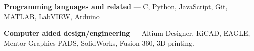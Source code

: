 \begin{zitemize}

    \item \textbf{Programming languages and related} --- C, Python, JavaScript, Git, MATLAB, LabVIEW, Arduino\\
    
    \item \textbf{Computer aided design/engineering} --- Altium Designer, KiCAD, EAGLE, Mentor Graphics PADS, SolidWorks, Fusion 360, 3D printing.
    
    \end{zitemize}